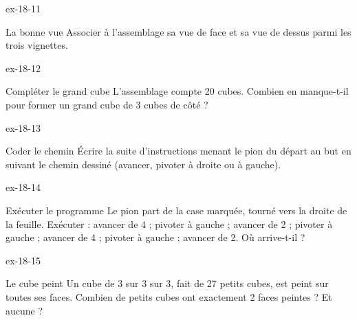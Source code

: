 \begin{blocLivre}{ex-18-11}\begin{exercice}[3]{La bonne vue}
Associer à l’assemblage sa vue de face et sa vue de dessus parmi les trois vignettes.
\label{fig-ex-18-11}
\end{exercice}\end{blocLivre}
\begin{blocLivre}{ex-18-12}\begin{exercice}[3]{Compléter le grand cube}
L’assemblage compte 20 cubes. Combien en manque-t-il pour former un grand cube de 3 cubes de côté ?
\label{fig-ex-18-12}
\end{exercice}\end{blocLivre}
\begin{blocLivre}{ex-18-13}\begin{exercice}[3]{Coder le chemin}
Écrire la suite d’instructions menant le pion du départ au but en suivant le chemin dessiné (avancer, pivoter à droite ou à gauche).
\label{fig-ex-18-13}
\end{exercice}\end{blocLivre}
\begin{blocLivre}{ex-18-14}\begin{exercice}[3]{Exécuter le programme}
Le pion part de la case marquée, tourné vers la droite de la feuille. Exécuter : avancer de 4 ; pivoter à gauche ; avancer de 2 ; pivoter à gauche ; avancer de 4 ; pivoter à gauche ; avancer de 2. Où arrive-t-il ?
\label{fig-ex-18-14}
\end{exercice}\end{blocLivre}
\begin{blocLivre}{ex-18-15}\begin{exercice}[3]{Le cube peint}
Un cube de 3 sur 3 sur 3, fait de 27 petits cubes, est peint sur toutes ses faces. Combien de petits cubes ont exactement 2 faces peintes ? Et aucune ?
\label{fig-ex-18-15}
\end{exercice}\end{blocLivre}

\clearpage
